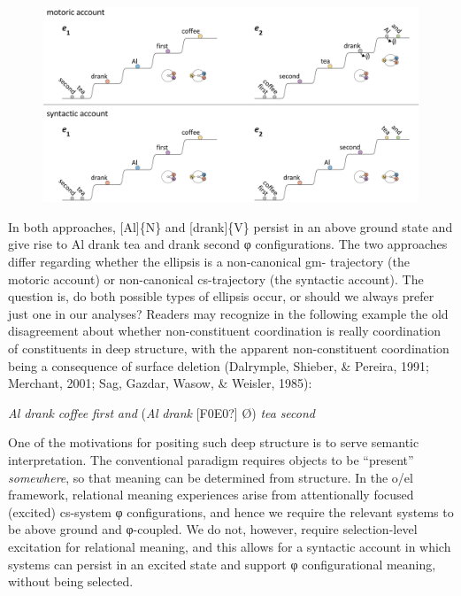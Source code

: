   
\begin{figure}
\includegraphics[width=\textwidth]{figures/Tilsen-img145.png}
\caption{\missingcaption}
\label{fig:}
\end{figure}
 

  In both approaches, [Al]\{N\} and [drank]\{V\} persist in an above ground state and give rise to {\textbar}Al drank tea{\textbar} and {\textbar}drank second{\textbar} φ configurations. The two approaches differ regarding whether the ellipsis is a non-canonical gm- trajectory (the motoric account) or non-canonical cs-trajectory (the syntactic account). The question is, do both possible types of ellipsis occur, or should we always prefer just one in our analyses? Readers may recognize in the following example the old disagreement about whether non-constituent coordination is really coordination of constituents in deep structure, with the apparent non-constituent coordination being a consequence of surface deletion (Dalrymple, Shieber, \& Pereira, 1991; Merchant, 2001; Sag, Gazdar, Wasow, \& Weisler, 1985): 

\textit{Al} \textit{drank} \textit{coffee} \textit{first} \textit{and} (\textit{Al} \textit{drank} [F0E0?] Ø) \textit{tea} \textit{second}

  One of the motivations for positing such deep structure is to serve semantic interpretation. The conventional paradigm requires objects to be “present” \textit{somewhere}, so that meaning can be determined from structure. In the o/el framework, relational meaning experiences arise from attentionally focused (excited) cs-system φ configurations, and hence we require the relevant systems to be above ground and φ-coupled. We do not, however, require selection-level excitation for relational meaning, and this allows for a syntactic account in which systems can persist in an excited state and support φ configurational meaning, without being selected. 

